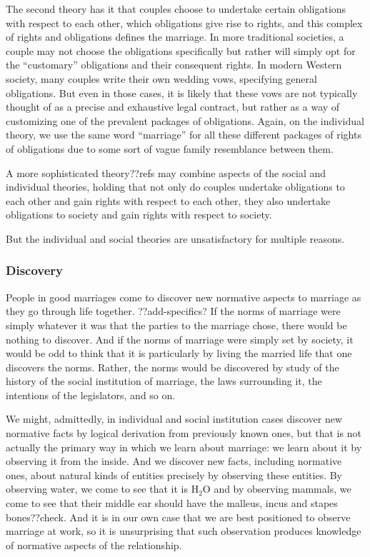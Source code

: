 The second theory has it that couples choose to undertake certain obligations with respect to each other, which obligations give rise to rights,
and this complex of rights and obligations defines the marriage. In more traditional societies, a couple may not choose the obligations specifically
but rather will simply opt for the ``customary'' obligations and their consequent rights. In modern Western society, many couples write their own
wedding vows, specifying general obligations. But even in those cases, it is likely that these vows are not typically thought of as a precise and exhaustive
legal contract, but rather as a way of customizing one of the prevalent packages of obligations. Again, on the individual theory, we use the same word
``marriage'' for all these different packages of rights of obligations due to some sort of vague family resemblance between them.

A more sophisticated theory??refs may combine aspects of the social and individual theories, holding that not only do couples undertake obligations to each other and gain
rights with respect to each other, they also undertake obligations to society and gain rights with respect to society.

But the individual and social theories are unsatisfactory for multiple reasons.

\subsubsection{Discovery}
People in good marriages come to discover new normative aspects to marriage as they go through life together. ??add-specifics?
If the norms of marriage were simply whatever it was that the parties to the marriage chose, there would be nothing to discover.
And if the norms of marriage were simply set by society, it would be odd to think that it is particularly by living the married life that
one discovers the norms. Rather, the norms would be discovered by study of the history of the social institution of marriage,
the laws surrounding it, the intentions of the legislators, and so on.

We might, admittedly, in individual and social institution cases discover
new normative facts by logical derivation from previously known ones, but that is not actually the primary way in which we learn about marriage:
we learn about it by observing it from the inside.
And we discover new facts, including normative ones, about natural kinds of entities precisely by observing these entities. By observing water,
we come to see that it is H$_2$O and by observing mammals, we come to see that their middle ear should have the malleus, incus and stapes bones??check. And
it is in our own case that we are best positioned to observe marriage at work, so it is unsurprising that such observation produces knowledge of normative
aspects of the relationship.

